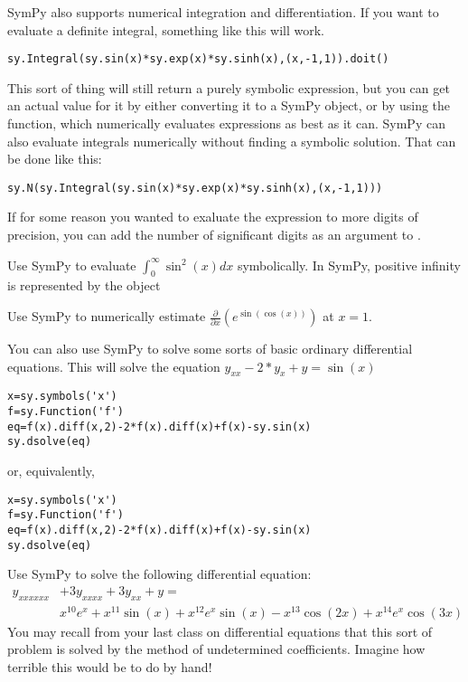SymPy also supports numerical integration and differentiation. 
If you want to evaluate a definite integral, something like this will work.
\begin{lstlisting}
sy.Integral(sy.sin(x)*sy.exp(x)*sy.sinh(x),(x,-1,1)).doit()
\end{lstlisting}
This sort of thing will still return a purely symbolic expression, but you can get an actual value for it by either converting it to a SymPy  object, or by using the  function, which numerically evaluates expressions as best as it can.
SymPy can also evaluate integrals numerically without finding a symbolic solution. That can be done like this:
\begin{lstlisting}
sy.N(sy.Integral(sy.sin(x)*sy.exp(x)*sy.sinh(x),(x,-1,1)))
\end{lstlisting}
If for some reason you wanted to exaluate the expression to more digits of precision, you can add the number of significant digits as an argument to .

\begin{problem}
Use SymPy to evaluate $\displaystyle{\int_0^\infty \sin^2 \left(x\right) dx}$ symbolically.
In SymPy, positive infinity is represented by the object 
\end{problem}

\begin{problem}
Use SymPy to numerically estimate $\frac{\partial}{\partial x}\left(e^{\sin\left(\cos\left(x\right)\right)}\right)$ at $x=1$.
\end{problem}

You can also use SymPy to solve some sorts of basic ordinary differential equations.
This will solve the equation $y_{xx}-2*y_x+y=\sin\left(x\right)$
\begin{lstlisting}
x=sy.symbols('x')
f=sy.Function('f')
eq=f(x).diff(x,2)-2*f(x).diff(x)+f(x)-sy.sin(x)
sy.dsolve(eq)
\end{lstlisting}
or, equivalently,
\begin{lstlisting}
x=sy.symbols('x')
f=sy.Function('f')
eq=f(x).diff(x,2)-2*f(x).diff(x)+f(x)-sy.sin(x)
sy.dsolve(eq)
\end{lstlisting}
\begin{problem}
Use SymPy to solve the following differential equation:
\begin{equation*}
\begin{split}
 y_{xxxxxx} & + 3y_{xxxx} + 3y_{xx} + y = \\
& x^{10}e^x + x^{11}\sin\left(x\right) + x^{12}e^x\sin\left(x\right) -x^{13}\cos\left(2x\right) + x^{14}e^x\cos\left(3x\right)
\end{split}
\end{equation*}
You may recall from your last class on differential equations that this sort of problem is solved by the method of undetermined coefficients. 
Imagine how terrible this would be to do by hand!
\end{problem}

